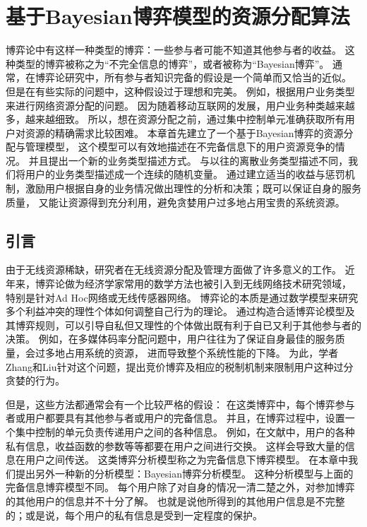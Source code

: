 \graphicspath{ {../body/bayesian_figures/}}
\chapter{基于Bayesian博弈模型的资源分配算法}
\par 博弈论中有这样一种类型的博弈：一些参与者可能不知道其他参与者的收益。
这种类型的博弈被称之为“不完全信息的博弈”，或者被称为“Bayesian博弈”。
通常，在博弈论研究中，所有参与者知识完备的假设是一个简单而又恰当的近似。
但是在有些实际的问题中，这种假设过于理想和完美。
例如，根据用户业务类型来进行网络资源分配的问题。
因为随着移动互联网的发展，用户业务种类越来越多，越来越细致。
所以，想在资源分配之前，通过集中控制单元准确获取所有用户对资源的精确需求比较困难。
本章首先建立了一个基于Bayesian博弈的资源分配与管理模型，
这个模型可以有效地描述在不完备信息下的用户资源竞争的情况。
并且提出一个新的业务类型描述方式。
与以往的离散业务类型描述不同，我们将用户的业务类型描述成一个连续的随机变量。
通过建立适当的收益与惩罚机制，激励用户根据自身的业务情况做出理性的分析和决策；既可以保证自身的服务质量，
又能让资源得到充分利用，避免贪婪用户过多地占用宝贵的系统资源。
%
\section{引言}
由于无线资源稀缺，研究者在无线资源分配及管理方面做了许多意义的工作。
近年来，博弈论做为经济学家常用的数学方法也被引入到无线网络技术研究领域，
特别是针对Ad Hoc网络或无线传感器网络\cite{Srivastava:2005}\cite{FangBensaou2004}。
博弈论的本质是通过数学模型来研究多个利益冲突的理性个体如何调整自己行为的理论。
通过构造合适博弈论模型及其博弈规则，可以引导自私但又理性的个体做出既有利于自已又利于其他参与者的决策。
例如，在多媒体码率分配问题中，用户往往为了保证自身最佳的服务质量，会过多地占用系统的资源，
进而导致整个系统性能的下降。
为此，学者Zhang和Liu针对这个问题，提出竞价博弈及相应的税制机制来限制用户这种过分贪婪的行为\cite{ZhangLiu2011}。

但是，这些方法都通常会有一个比较严格的假设：
在这类博弈中，每个博弈参与者或用户都要具有其他参与者或用户的完备信息。
并且，在博弈过程中，设置一个集中控制的单元负责传递用户之间的各种信息。
例如，在文献\cite{ZhangLiu2011}中，用户的各种私有信息，收益函数的参数等等都要在用户之间进行交换。
这样会导致大量的信息在用户之间传送。
这类博弈分析模型称之为完备信息下博弈模型。
在本章中我们提出另外一种新的分析模型：Bayesian博弈分析模型。
这种分析模型与上面的完备信息博弈模型不同。
每个用户除了对自身的情况一清二楚之外，对参加博弈的其他用户的信息并不十分了解。
也就是说他所得到的其他用户信息是不完整的；或是说，每个用户的私有信息是受到一定程度的保护。

